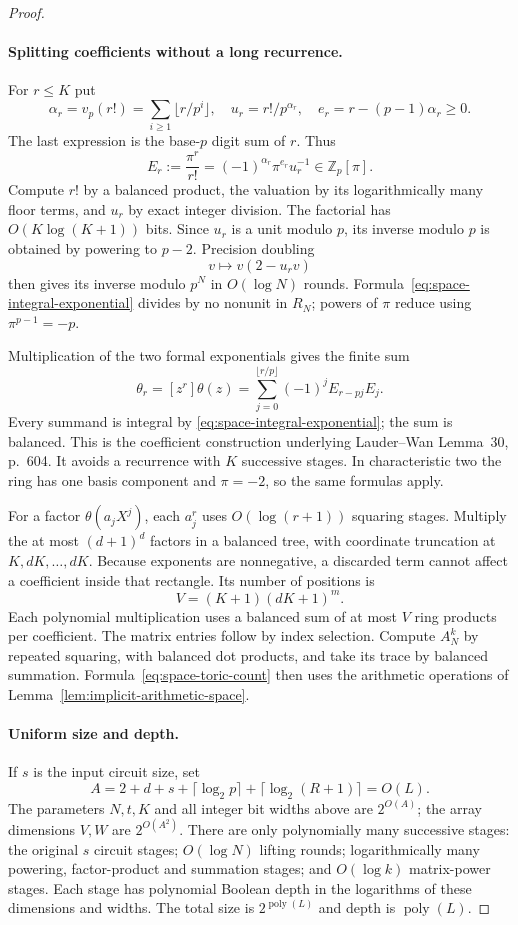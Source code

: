\begin{proof}
\paragraph{Splitting coefficients without a long recurrence.}
For $r\le K$ put
\[
 \alpha_r=v_p(r!)=\sum_{i\ge1}\lfloor r/p^i\rfloor,
 \quad u_r=r!/p^{\alpha_r},
 \quad e_r=r-(p-1)\alpha_r\ge0.
\]
The last expression is the base-$p$ digit sum of $r$. Thus
\begin{equation}\label{eq:space-integral-exponential}
 E_r:=\frac{\pi^r}{r!}
       =(-1)^{\alpha_r}\pi^{e_r}u_r^{-1}\in\mathbb Z_p[\pi].
\end{equation}
Compute $r!$ by a balanced product, the valuation by its logarithmically many floor terms, and $u_r$ by exact integer division. The factorial has $O(K\log(K+1))$ bits. Since $u_r$ is a unit modulo $p$, its inverse modulo $p$ is obtained by powering to $p-2$. Precision doubling
\[
 v\longmapsto v(2-u_rv)
\]
then gives its inverse modulo $p^N$ in $O(\log N)$ rounds. Formula~\eqref{eq:space-integral-exponential} divides by no nonunit in $R_N$; powers of $\pi$ reduce using $\pi^{p-1}=-p$.

Multiplication of the two formal exponentials gives the finite sum
\[
 \theta_r=[z^r]\theta(z)
   =\sum_{j=0}^{\lfloor r/p\rfloor}(-1)^jE_{r-pj}E_j.
\]
Every summand is integral by \eqref{eq:space-integral-exponential}; the sum is balanced. This is the coefficient construction underlying Lauder--Wan Lemma~30, p.~604. It avoids a recurrence with $K$ successive stages. In characteristic two the ring has one basis component and $\pi=-2$, so the same formulas apply.

For a factor $\theta(a_jX^j)$, each $a_j^r$ uses $O(\log(r+1))$ squaring stages. Multiply the at most $(d+1)^d$ factors in a balanced tree, with coordinate truncation at $K,dK,\ldots,dK$. Because exponents are nonnegative, a discarded term cannot affect a coefficient inside that rectangle. Its number of positions is
\[
 V=(K+1)(dK+1)^m.
\]
Each polynomial multiplication uses a balanced sum of at most $V$ ring products per coefficient. The matrix entries follow by index selection. Compute $A_N^k$ by repeated squaring, with balanced dot products, and take its trace by balanced summation. Formula~\eqref{eq:space-toric-count} then uses the arithmetic operations of Lemma~\ref{lem:implicit-arithmetic-space}.

\paragraph{Uniform size and depth.}
If $s$ is the input circuit size, set
\[
 A=2+d+s+\lceil\log_2p\rceil+\lceil\log_2(R+1)\rceil=O(L).
\]
The parameters $N,t,K$ and all integer bit widths above are $2^{O(A)}$; the array dimensions $V,W$ are $2^{O(A^2)}$. There are only polynomially many successive stages: the original $s$ circuit stages; $O(\log N)$ lifting rounds; logarithmically many powering, factor-product and summation stages; and $O(\log k)$ matrix-power stages. Each stage has polynomial Boolean depth in the logarithms of these dimensions and widths. The total size is $2^{\operatorname{poly}(L)}$ and depth is $\operatorname{poly}(L)$.


\end{proof}
